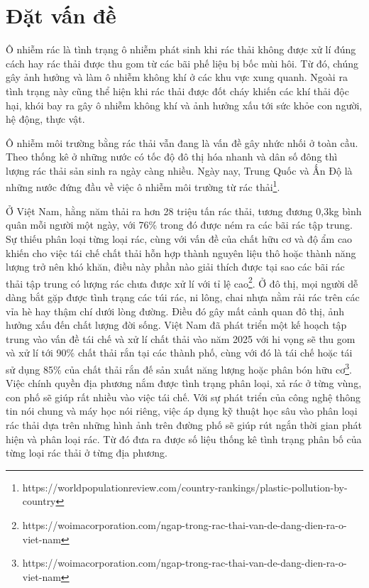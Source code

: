 \documentclass[../the.tex]{subfiles}
\begin{document}
\section{Đặt vấn đề}
\label{tong_quan}

{\fontsize{13}{12} \selectfont
Ô nhiễm rác là tình trạng ô nhiễm phát sinh khi rác thải không được xử lí đúng cách hay rác thải được thu gom từ các bãi phế liệu bị bốc mùi hôi. Từ đó, chúng gây ảnh hưởng và làm ô nhiễm không khí ở các khu vực xung quanh. Ngoài ra tình trạng này cũng thể hiện khi rác thải được đốt cháy khiến các khí thải độc hại, khói bay ra gây ô nhiễm không khí và ảnh hưởng xấu tới sức khỏe con người, hệ động, thực vật.
}
\bigskip

{\fontsize{13}{12} \selectfont
Ô nhiễm môi trường bằng rác thải vẫn đang là vấn đề gây nhức nhối ở toàn cầu. Theo thống kê ở những nước có tốc độ đô thị hóa nhanh và dân số đông thì lượng rác thải sản sinh ra ngày càng nhiều. Ngày nay, Trung Quốc và Ấn Độ là những nước đứng đầu về việc ô nhiễm môi trường từ rác thải\footnote[1]{https://worldpopulationreview.com/country-rankings/plastic-pollution-by-country}.
}
\bigskip

{\fontsize{13}{12} \selectfont
Ở Việt Nam, hằng năm thải ra hơn 28 triệu tấn rác thải, tương đương 0,3kg bình quân mỗi người một ngày, với 76\% trong đó được ném ra các bãi rác tập trung. Sự thiếu phân loại từng loại rác, cùng với vấn đề của chất hữu cơ và độ ẩm cao khiến cho việc tái chế chất thải hỗn hợp thành nguyên liệu thô hoặc thành năng lượng trở nên khó khăn, điều này phần nào giải thích được tại sao các bãi rác thải tập trung có lượng rác chưa được xử lí với tỉ lệ cao\footnote[2]{https://woimacorporation.com/ngap-trong-rac-thai-van-de-dang-dien-ra-o-viet-nam}. Ở đô thị, mọi người dễ dàng bắt gặp được tình trạng các túi rác, ni lông, chai nhựa nằm rải rác trên các vỉa hè hay thậm chí dưới lòng đường. Điều đó gây mất cảnh quan đô thị, ảnh hưởng xấu đến chất lượng đời sống. Việt Nam đã phát triển một kế hoạch tập trung vào vấn đề tái chế và xử lí chất thải vào năm 2025 với hi vọng sẽ thu gom và xử lí tới 90\% chất thải rắn tại các thành phố, cùng với đó là tái chế hoặc tái sử dụng 85\% của chất thải rắn đế sản xuất năng lượng hoặc phân bón hữu cơ\footnote[3]{https://woimacorporation.com/ngap-trong-rac-thai-van-de-dang-dien-ra-o-viet-nam}. Việc chính quyền địa phương nắm được tình trạng phân loại, xả rác ở từng vùng, con phố sẽ giúp rất nhiều vào việc tái chế. Với sự phát triển của công nghệ thông tin nói chung và máy học nói riêng, việc áp dụng kỹ thuật học sâu vào phân loại rác thải dựa trên những hình ảnh trên đường phố sẽ giúp rút ngắn thời gian phát hiện và phân loại rác. Từ đó đưa ra được số liệu thống kê tình trạng phân bố của từng loại rác thải ở từng địa phương.
}
\bigskip
\end{document}
